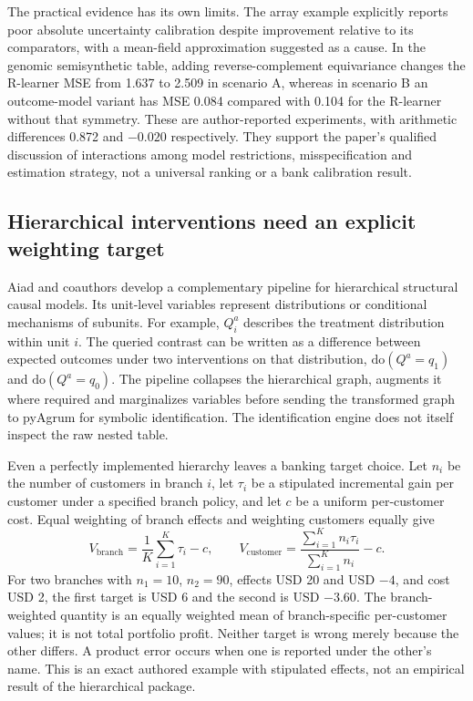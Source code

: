 The practical evidence has its own limits. The array example explicitly
reports poor absolute uncertainty calibration despite improvement relative
to its comparators, with a mean-field approximation suggested as a cause.
In the genomic semisynthetic table, adding reverse-complement equivariance
changes the R-learner MSE from 1.637 to 2.509 in scenario A, whereas in
scenario B an outcome-model variant has MSE 0.084 compared with 0.104 for
the R-learner without that symmetry. These are author-reported experiments,
with arithmetic differences 0.872 and $-0.020$ respectively. They support
the paper's qualified discussion of interactions among model restrictions,
misspecification and estimation strategy, not a universal ranking or a bank
calibration result.
\citep{exec23_geometric_models,exec23_structured_reference}

\subsection{Hierarchical interventions need an explicit weighting target}
\label{exec23:structured-target}

Aiad and coauthors develop a complementary pipeline for hierarchical
structural causal models. Its unit-level variables represent distributions
or conditional mechanisms of subunits. For example, $Q_i^a$ describes
the treatment distribution within unit $i$. The queried contrast can be
written as a difference between expected outcomes under two interventions
on that distribution, $\mathrm{do}(Q^a=q_1)$ and
$\mathrm{do}(Q^a=q_0)$. The pipeline collapses the hierarchical graph,
augments it where required and marginalizes variables before sending the
transformed graph to pyAgrum for symbolic identification. The identification
engine does not itself inspect the raw nested table.
\citep{exec23_hierarchical_pipeline}

Even a perfectly implemented hierarchy leaves a banking target choice. Let
$n_i$ be the number of customers in branch $i$, let $\tau_i$ be a
stipulated incremental gain per customer under a specified branch policy,
and let $c$ be a uniform per-customer cost. Equal weighting of branch
effects and weighting customers equally give
\begin{equation}
 V_{\mathrm{branch}}=\frac1K\sum_{i=1}^K\tau_i-c,\qquad
 V_{\mathrm{customer}}=\frac{\sum_{i=1}^K n_i\tau_i}{\sum_{i=1}^K n_i}-c.
 \label{exec23:structured-weights}
\end{equation}
For two branches with $n_1=10$, $n_2=90$, effects USD 20 and USD $-4$,
and cost USD 2, the first target is USD 6 and the second is USD $-3.60$.
The branch-weighted quantity is an equally weighted mean of branch-specific
per-customer values; it is not total portfolio profit. Neither target is
wrong merely because the other differs. A product error occurs when one is
reported under the other's name. This is an exact authored example with
stipulated effects, not an empirical result of the hierarchical package.
\citep{exec23_structured_reference}

